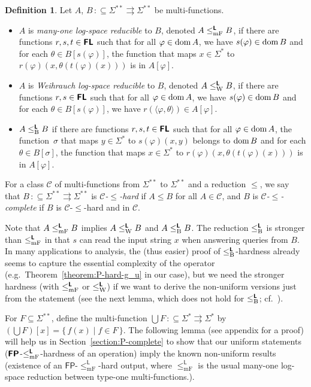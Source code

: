 \documentclass[conference]{IEEEtran}
\newcommand{\classonefont}[1]{\mathsf{#1}}
\newcommand{\classL}{\classonefont{L}}
\newcommand{\classFP}{\classonefont{FP}}
\newcommand{\classtwofont}[1]{\text{\bfseries \sffamily \upshape #1}}
\newcommand{\classLtwo}{\classtwofont{L}}
\newcommand{\classFLtwo}{\classtwofont{FL}}
\newcommand{\classFPtwo}{\classtwofont{FP}}
\newcommand{\redW}{\leq _{\mathrm W}}
\newcommand{\redmF}{\leq _{\mathrm{mF}}}
\newcommand{\redB}{\leq _{\mathrm B}}
\newcommand{\redLW}{\redW ^{\classLtwo}}
\newcommand{\redLmF}{\redmF ^{\classLtwo}}
\newcommand{\redLB}{\redB ^{\classLtwo}}
\newcommand{\LM}{\varSigma ^{**}}
\newcommand{\dom}{\mathop{\rm dom}}
\theoremstyle{definition}
\newtheorem{definition}[theorem]{Definition}
\theoremstyle{remark}
\newcommand{\pcolon}{\mathpunct{\,:\subseteq}}
\begin{document}
\begin{definition}
Let $A$, $B \pcolon \LM \rightrightarrows \LM$ be multi-functions.
\begin{itemize}
 \item $A$ is \emph{many-one log-space reducible} to $B$, 
       denoted $A \redLmF B$,
       if there are functions $r, s, t \in \classFLtwo$ such that 
       for all $\varphi \in \dom A$,
       we have $s(\varphi) \in \dom B$ and 
       for each $\theta \in B[s(\varphi)]$, 
       the function that maps $x \in \varSigma^*$ to $r(\varphi)(x, \theta(t(\varphi)(x)))$
       is in $A[\varphi]$.
 \item $A$ is \emph{Weihrauch log-space reducible} to $B$,
       denoted $A \redLW B$,
       if there are functions $r, s \in \classFLtwo$ such that 
       for all $\varphi \in \dom A$,
       we have $s(\varphi) \in \dom B$ and 
       for each $\theta \in B[s(\varphi)]$, 
       we have $r(\langle \varphi, \theta \rangle) \in A[\varphi]$.
 \item $A \redLB B$ 
if there are functions $r, s, t \in \classFLtwo$ such that 
for all $\varphi \in \dom A$,
the function~$\sigma$ that maps $y \in \varSigma ^*$ to $s (\varphi) (x, y)$
belongs to $\dom B$ 
and for each $\theta \in B [\sigma]$, 
the function that maps $x \in \varSigma^*$ 
to $r(\varphi)(x, \theta(t(\varphi)(x)))$ is in $A[\varphi]$.
\end{itemize}
\end{definition}

For a class $\mathcal{C}$ of multi-functions from $\LM$ to $\LM$
and a reduction $\leq$, 
we say that $B \pcolon \LM \rightrightarrows \LM$ is 
\emph{$\mathcal{C}$-$\leq$-hard} if $A \leq B$ for all $A \in \mathcal{C}$,
and $B$ is \emph{$\mathcal{C}$-$\leq$-complete} 
if $B$ is $\mathcal{C}$-$\leq$-hard and in $\mathcal{C}$.

Note that $A \redLmF B$ implies $A \redLW B$ and $A \redLB B$. 
The reduction $\redLB$ is stronger than $\redLmF$ in that 
$s$ can read the input string $x$ when answering queries from $B$.
In many applications to analysis, 
the (thus easier) proof of $\redLB$-hardness 
already seems to capture the essential complexity of the operator
(e.g.~Theorem~\ref{theorem:P-hard-g_u} in our case), 
but we need the stronger hardness (with $\redLmF$ or $\redLW$)
if we want to derive the non-uniform versions just from the statement
(see the next lemma, which does not hold for
$\redLB$; cf.~\cite[Lemma~3.6]{kawamura2012complexity}). 

For $F \subseteq \LM$, 
define the multi-function $\bigcup F \pcolon \varSigma ^* \rightrightarrows \varSigma ^*$ by
$(\bigcup F) [x] = \{\, f(x) \mid f \in F \,\}$.
The following lemma (see appendix for a proof)
will help us in Section~\ref{section:P-complete} to show that 
our uniform statements ($\classFPtwo$-$\redLmF$-hardness of an operation)
imply the known non-uniform results 
\newcommand{\redoneLmF}{\le^\classL_{\mathrm{mF}}}
(existence of an $\classFP$-$\redoneLmF$-hard output, 
where $\redoneLmF$ is the usual many-one log-space reduction 
between type-one multi-functions.). 
\end{document}
